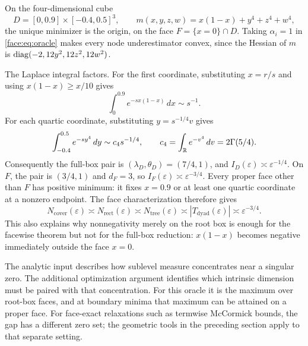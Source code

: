 \begin{example}
 \label{face:ex:boundary}
On the four-dimensional cube
\[
 D=[0,0.9]\times[-0.4,0.5]^3,
 \qquad m(x,y,z,w)=x(1-x)+y^4+z^4+w^4,
\]
the unique minimizer is the origin, on the face $F=\{x=0\}\cap D$.
Taking $\alpha_i=1$ in \eqref{face:eq:oracle} makes every node
underestimator convex, since the Hessian of $m$ is
$\operatorname{diag}(-2,12y^2,12z^2,12w^2)$.

The Laplace integral factors.  For the first coordinate, substituting
$x=r/s$ and using $x(1-x)\ge x/10$ gives
\[
 \int_0^{0.9}e^{-s x(1-x)}\,dx\sim s^{-1}.
\]
For each quartic coordinate, substituting $y=s^{-1/4}v$ gives
\[
 \int_{-0.4}^{0.5}e^{-sy^4}\,dy
 \sim c_4s^{-1/4},\qquad
 c_4=\int_{\mathbb{R}} e^{-v^4}\,dv=2\Gamma(5/4).
\]
Consequently the full-box pair is $(\lambda_D,\theta_D)=(7/4,1)$,
and $I_D(\varepsilon)\asymp\varepsilon^{-1/4}$.
On $F$, the pair is $(3/4,1)$ and $d_F=3$, so
$I_F(\varepsilon)\asymp\varepsilon^{-3/4}$.
Every proper face other than $F$ has positive minimum: it fixes $x=0.9$
or at least one quartic coordinate at a nonzero endpoint.  The
face characterization therefore gives
\[
 N_{\mathrm{cover}}(\varepsilon)
 \asymp N_{\mathrm{rect}}(\varepsilon)
 \asymp N_{\mathrm{tree}}(\varepsilon)
 \asymp |T_{\mathrm{dyad}}(\varepsilon)|
 \asymp\varepsilon^{-3/4}.
\]
This also explains why nonnegativity merely on the root box is enough
for the facewise theorem but not for the full-box reduction:
$x(1-x)$ becomes negative immediately outside the face $x=0$.
\end{example}

The analytic input describes how sublevel measure concentrates near a
singular zero.  The additional optimization argument identifies which
intrinsic dimension must be paired with that concentration.  For this
oracle it is the maximum over root-box faces, and at boundary minima
that maximum can be attained on a proper face.  For face-exact
relaxations such as termwise McCormick bounds, the gap has a different
zero set; the geometric tools in the preceding section apply to that
separate setting.
